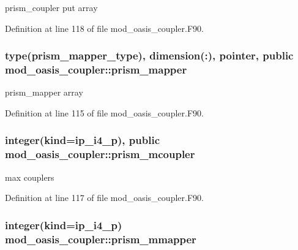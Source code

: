 prism\+\_\+coupler put array 



Definition at line 118 of file mod\+\_\+oasis\+\_\+coupler.\+F90.

\hypertarget{classmod__oasis__coupler_a2b968dbcb61e7aed11074494ab041cd4}{
\subsubsection[{prism\+\_\+mapper}]{\setlength{\rightskip}{0pt plus 5cm}type({\bf prism\+\_\+mapper\+\_\+type}), dimension(\+:), pointer, public mod\+\_\+oasis\+\_\+coupler\+::prism\+\_\+mapper}}\label{classmod__oasis__coupler_a2b968dbcb61e7aed11074494ab041cd4}


prism\+\_\+mapper array 



Definition at line 115 of file mod\+\_\+oasis\+\_\+coupler.\+F90.

\hypertarget{classmod__oasis__coupler_aaa019c39b0f657e7c37820697ecf354a}{
\subsubsection[{prism\+\_\+mcoupler}]{\setlength{\rightskip}{0pt plus 5cm}integer(kind=ip\+\_\+i4\+\_\+p), public mod\+\_\+oasis\+\_\+coupler\+::prism\+\_\+mcoupler}}\label{classmod__oasis__coupler_aaa019c39b0f657e7c37820697ecf354a}


max couplers 



Definition at line 117 of file mod\+\_\+oasis\+\_\+coupler.\+F90.

\hypertarget{classmod__oasis__coupler_a3e879d9a711d847bf5079752100405e8}{
\subsubsection[{prism\+\_\+mmapper}]{\setlength{\rightskip}{0pt plus 5cm}integer(kind=ip\+\_\+i4\+\_\+p) mod\+\_\+oasis\+\_\+coupler\+::prism\+\_\+mmapper\hspace{0.3cm}{\ttfamily [private]}}}\label{classmod__oasis__coupler_a3e879d9a711d847bf5079752100405e8}


